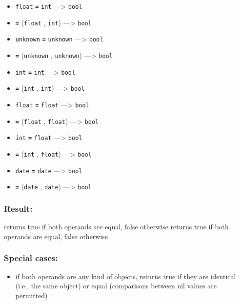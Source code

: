 \documentclass[]{book}
\providecommand{\tightlist}{%
  \setlength{\itemsep}{0pt}\setlength{\parskip}{0pt}}
\theoremstyle{definition}
\theoremstyle{definition}
\theoremstyle{definition}
\theoremstyle{remark}
\begin{document}
\begin{itemize}
\tightlist
\item
  \texttt{float} \textbf{\texttt{=}} \texttt{int} ---\textgreater{}
  \texttt{bool}
\item
  \textbf{\texttt{=}} (\texttt{float} , \texttt{int}) ---\textgreater{}
  \texttt{bool}
\item
  \texttt{unknown} \textbf{\texttt{=}} \texttt{unknown}
  ---\textgreater{} \texttt{bool}
\item
  \textbf{\texttt{=}} (\texttt{unknown} , \texttt{unknown})
  ---\textgreater{} \texttt{bool}
\item
  \texttt{int} \textbf{\texttt{=}} \texttt{int} ---\textgreater{}
  \texttt{bool}
\item
  \textbf{\texttt{=}} (\texttt{int} , \texttt{int}) ---\textgreater{}
  \texttt{bool}
\item
  \texttt{float} \textbf{\texttt{=}} \texttt{float} ---\textgreater{}
  \texttt{bool}
\item
  \textbf{\texttt{=}} (\texttt{float} , \texttt{float})
  ---\textgreater{} \texttt{bool}
\item
  \texttt{int} \textbf{\texttt{=}} \texttt{float} ---\textgreater{}
  \texttt{bool}
\item
  \textbf{\texttt{=}} (\texttt{int} , \texttt{float}) ---\textgreater{}
  \texttt{bool}
\item
  \texttt{date} \textbf{\texttt{=}} \texttt{date} ---\textgreater{}
  \texttt{bool}
\item
  \textbf{\texttt{=}} (\texttt{date} , \texttt{date}) ---\textgreater{}
  \texttt{bool}
\end{itemize}

\subsubsection{Result:}\label{result-12}

returns true if both operands are equal, false otherwise returns true if
both operands are equal, false otherwise

\subsubsection{Special cases:}\label{special-cases-10}

\begin{itemize}
\tightlist
\item
  if both operands are any kind of objects, returns true if they are
  identical (i.e., the same object) or equal (comparisons between nil
  values are permitted)
\end{itemize}
\end{document}
